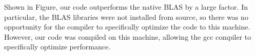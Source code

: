 \documentclass{article} %
\begin{document}
Shown in Figure, our code outperforms the native BLAS by a large factor.
In particular, the BLAS libraries were not installed from source, so there was no
opportunity for the compiler to specifically optimize the code to this machine.
However, our code was compiled on this machine, allowing the gcc compiler to specifically
optimize performance.

\small


\end{document}
